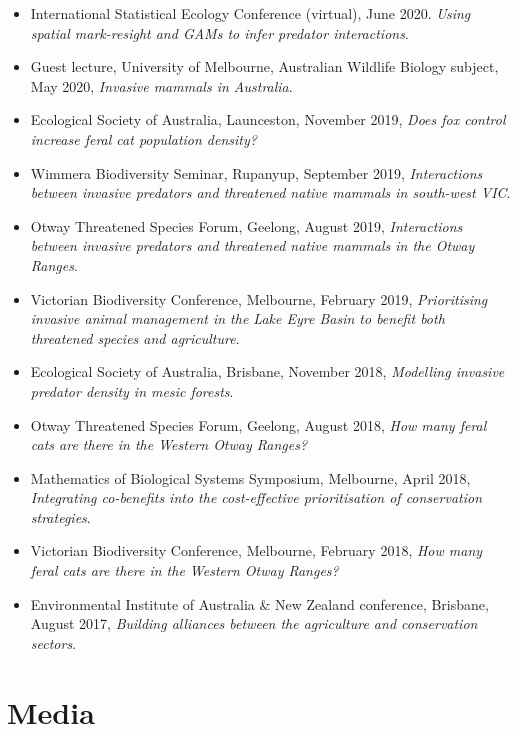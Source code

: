 \documentclass[10pt,a4paper,]{article}
\providecommand{\tightlist}{%
  \setlength{\itemsep}{0pt}\setlength{\parskip}{0pt}}
\begin{document}
\begin{itemize}
\tightlist
\item
  International Statistical Ecology Conference (virtual), June 2020. \emph{Using spatial mark-resight and GAMs to infer predator interactions}.
\item
  Guest lecture, University of Melbourne, Australian Wildlife Biology subject, May 2020, \emph{Invasive mammals in Australia}.
\item
  Ecological Society of Australia, Launceston, November 2019, \emph{Does fox control increase feral cat population density?}
\item
  Wimmera Biodiversity Seminar, Rupanyup, September 2019, \emph{Interactions between invasive predators and threatened native mammals in south-west VIC}.
\item
  Otway Threatened Species Forum, Geelong, August 2019, \emph{Interactions between invasive predators and threatened native mammals in the Otway Ranges}.
\item
  Victorian Biodiversity Conference, Melbourne, February 2019, \emph{Prioritising invasive animal management in the Lake Eyre Basin to benefit both threatened species and agriculture}.
\item
  Ecological Society of Australia, Brisbane, November 2018, \emph{Modelling invasive predator density in mesic forests}.
\item
  Otway Threatened Species Forum, Geelong, August 2018, \emph{How many feral cats are there in the Western Otway Ranges?}
\item
  Mathematics of Biological Systems Symposium, Melbourne, April 2018, \emph{Integrating co-benefits into the cost-effective prioritisation of conservation strategies}.
\item
  Victorian Biodiversity Conference, Melbourne, February 2018, \emph{How many feral cats are there in the Western Otway Ranges?}
\item
  Environmental Institute of Australia \& New Zealand conference, Brisbane, August 2017, \emph{Building alliances between the agriculture and conservation sectors}.
\end{itemize}

\hypertarget{media}{%
\section{Media}\label{media}}
\end{document}
